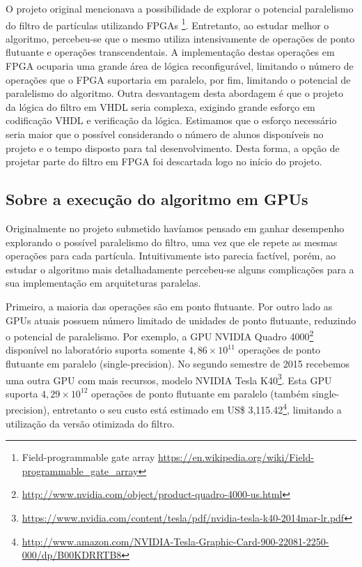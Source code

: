 \documentclass[
	12pt,				%
	openright,			%
	oneside,			%
	a4paper,			%
	english,			%
	french,				%
	spanish,			%
	brazil,				%
	]{abntex2}
\begin{document}
O projeto original mencionava a possibilidade de explorar o potencial paralelismo do filtro de partículas utilizando FPGAs \footnote{ Field-programmable gate array \url{https://en.wikipedia.org/wiki/Field-programmable_gate_array}}. Entretanto, ao estudar melhor o algoritmo, percebeu-se que o mesmo utiliza intensivamente de operações de ponto flutuante e operações transcendentais. A implementação destas operações em FPGA ocuparia uma grande área de lógica reconfigurável, limitando o número de operações que o FPGA suportaria em paralelo, por fim, limitando o potencial de paralelismo do algoritmo. Outra desvantagem desta abordagem é que o projeto da lógica do filtro em VHDL seria complexa, exigindo grande esforço em codificação VHDL e verificação da lógica. Estimamos que o esforço necessário seria maior que o possível considerando o número de alunos disponíveis no projeto e o tempo disposto para tal desenvolvimento. Desta forma, a opção de projetar parte do filtro em FPGA foi descartada logo no início do projeto.

\subsection{Sobre a execução do algoritmo em GPUs}

Originalmente no projeto submetido havíamos pensado em ganhar desempenho explorando o possível paralelismo do filtro, uma vez que ele repete as mesmas operações para cada partícula. Intuitivamente isto parecia factível, porém, ao estudar o algoritmo mais detalhadamente percebeu-se alguns complicações para a sua implementação em arquiteturas paralelas. 

Primeiro, a maioria das operações são em ponto flutuante. Por outro lado as GPUs atuais possuem número limitado de unidades de ponto flutuante, reduzindo o potencial de paralelismo. Por exemplo, a GPU NVIDIA Quadro 4000\footnote{\url{http://www.nvidia.com/object/product-quadro-4000-us.html}} disponível no laboratório suporta somente $4,86\times10^{11}$ operações de ponto flutuante em paralelo (single-precision). No segundo semestre de 2015 recebemos uma outra GPU com mais recursos, modelo NVIDIA Tesla K40\footnote{\url{https://www.nvidia.com/content/tesla/pdf/nvidia-tesla-k40-2014mar-lr.pdf}}. Esta GPU suporta $4,29\times10^{12}$ operações de ponto flutuante em paralelo (também single-precision), entretanto o seu custo está estimado em US\$ 3,115.42\footnote{\url{http://www.amazon.com/NVIDIA-Tesla-Graphic-Card-900-22081-2250-000/dp/B00KDRRTB8}}, limitando a utilização da versão otimizada do filtro. 
\end{document}
